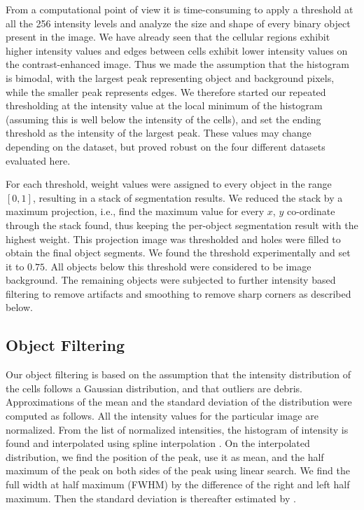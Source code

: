 \documentclass[journal]{IEEEtran}
\begin{document}
From a computational point of view it is time-consuming to apply a threshold at all the 256 intensity levels and analyze the size and shape of every binary object present in the image. We have already seen that the cellular regions exhibit higher intensity values and edges between cells exhibit lower intensity values on the contrast-enhanced image. Thus we made the assumption that the histogram is bimodal, with the largest peak representing object and background pixels, while the smaller peak represents edges. We therefore started our repeated thresholding at the intensity value at the local minimum of the histogram (assuming this is well below the intensity of the cells), and set the ending threshold as the intensity of the largest peak. These values may change depending on the dataset, but proved robust on the four different datasets evaluated here.

For each threshold, weight values were assigned to every object in the range$ [0, 1]$, resulting in a stack of segmentation results. We reduced the stack by a maximum projection, i.e., find the maximum value for every $x$, $y$ co-ordinate through the stack found, thus keeping the per-object segmentation result with the highest weight. This projection image was thresholded and holes were filled to obtain the final object segments. We found the threshold experimentally and set it to $0.75$. All objects below this threshold were considered to be image background. The remaining objects were subjected to further intensity based filtering to remove artifacts and smoothing to remove sharp corners as described below. 

\subsection{Object Filtering}

Our object filtering is based on the assumption that the intensity distribution of the cells follows a Gaussian distribution, and that outliers are debris. Approximations of the mean and the  standard deviation of the distribution were computed as follows. All the intensity values for the particular image are normalized. From the list of normalized intensities, the histogram of intensity is found and interpolated using spline interpolation \cite {jonesscipy2001}. On the interpolated distribution, we find the position of the peak, use it as mean, and the half maximum of the peak on both sides of the peak using linear search. We find the full width at half maximum (FWHM) by the difference of the right and left half maximum. Then the standard deviation is thereafter estimated by \cite {weissteinfull}.  
\end{document}
